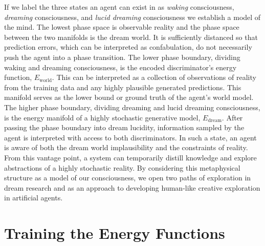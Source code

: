 \documentclass{article}
\begin{document}
If we label the three states an agent can exist in as \textit{waking} consciousness, \textit{dreaming} consciousness, and \textit{lucid dreaming} consciousness we establish a model of the mind. The lowest phase space is observable reality and the phase space between the two manifolds is the dream world. It is sufficiently distanced so that prediction errors, which can be interpreted as confabulation, do not necessarily push the agent into a phase transition. The lower phase boundary, dividing waking and dreaming consciousness, is the encoded discriminator's energy function, $E_{\text{world}}$. This can be interpreted as a collection of observations of reality from the training data and any highly plausible generated predictions. This manifold serves as the lower bound or ground truth of the agent's world model. The higher phase boundary, dividing dreaming and lucid dreaming consciousness, is the energy manifold of a highly stochastic generative model, $E_{\text{dream}}$.  After passing the phase boundary into dream lucidity,  information sampled by the agent is interpreted with access to both discriminators. In such a state, an agent is aware of both the dream world implausibility and the constraints of reality. From this vantage point, a system can temporarily distill knowledge and explore abstractions of a highly stochastic reality. By considering this metaphysical structure  as a model of our consciousness, we open two paths of exploration in dream research and as an approach to developing human-like creative exploration in artificial agents.



\section{Training the Energy Functions}

\end{document}
